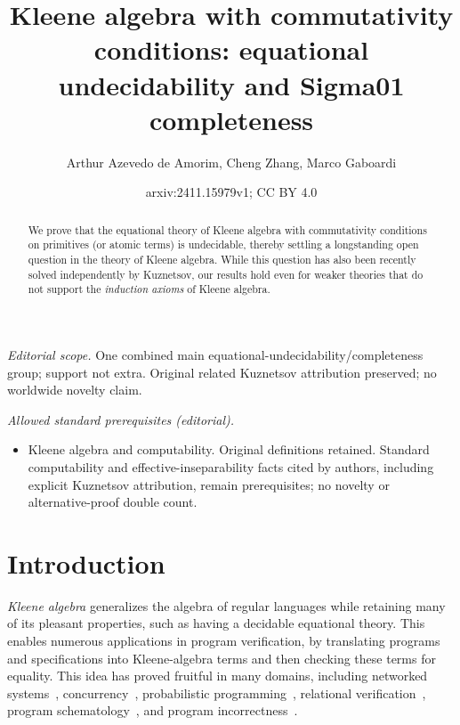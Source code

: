 \documentclass[11pt,a4paper]{amsart}
\title{Kleene algebra with commutativity conditions: equational undecidability and Sigma01 completeness}
\author{Arthur Azevedo de Amorim, Cheng Zhang, Marco Gaboardi}
\date{arxiv:2411.15979v1; CC BY 4.0}
\theoremstyle{definition}
\begin{document}
\maketitle
\noindent\textit{Editorial scope.} One combined main equational-undecidability/completeness group; support not extra. Original related Kuznetsov attribution preserved; no worldwide novelty claim.\par\medskip
\noindent\textit{Allowed standard prerequisites (editorial).}\begin{itemize}
\item Kleene algebra and computability. Original definitions retained. Standard computability and effective-inseparability facts cited by authors, including explicit Kuznetsov attribution, remain prerequisites; no novelty or alternative-proof double count.
\end{itemize}\medskip
\begin{abstract}
  We prove that the equational theory of Kleene algebra with commutativity
  conditions on primitives (or atomic terms) is undecidable, thereby settling a
  longstanding open question in the theory of Kleene algebra.  While this
  question has also been recently solved independently by Kuznetsov, our results
  hold even for weaker theories that do not support the \emph{induction axioms}
  of Kleene algebra.
\end{abstract}

\section{Introduction}

\emph{Kleene algebra} generalizes the algebra of regular languages while
retaining many of its pleasant properties, such as having a decidable equational
theory.  This enables numerous applications in program verification, by
translating programs and specifications into Kleene-algebra terms and then
checking these terms for equality.  This idea has proved fruitful in many
domains, including networked
systems~\cite{Anderson_Foster_Guha_Jeannin_Kozen_Schlesinger_Walker_2014,Foster_Kozen_Milano_Silva_Thompson_2015},
concurrency~\cite{Hoare_Möller_Struth_Wehrman_2009,Kappé_Brunet_Silva_Wagemaker_Zanasi_2020,Kappé_Brunet_Silva_Zanasi_2018},
probabilistic programming~\cite{McIver_Cohen_Morgan_2006,
  McIver_Rabehaja_Struth_2011}, relational
verification~\cite{Antonopoulos_Koskinen_Le_Nagasamudram_Naumann_Ngo_2022},
program schematology~\cite{Angus_Kozen_2001}, and program
incorrectness~\cite{Zhang_deAmorim_Gaboardi_2022}.
\end{document}
